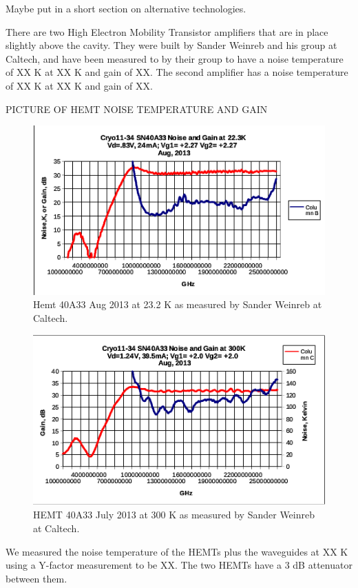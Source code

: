 \documentclass[11pt]{article}
\begin{document}
Maybe put in a short section on alternative technologies.

There are two High Electron Mobility Transistor amplifiers that are in place slightly above the cavity. They were built by Sander Weinreb and his group at Caltech, and have been measured to by their group to have a noise temperature of XX K at XX K and gain of XX. The second amplifier has a noise temperature of XX  K at XX K and gain of XX.

PICTURE OF HEMT NOISE TEMPERATURE AND GAIN
\begin{figure}
\includegraphics[scale=0.9]{hemt1afterrepairaug}
\caption{Hemt 40A33 Aug 2013 at 23.2 K as measured by Sander Weinreb at Caltech.}
\end{figure}

\begin{figure}
\includegraphics[scale=0.9]{hemt1afterrepairwarm}
\caption{HEMT 40A33 July 2013 at 300 K as measured by Sander Weinreb at Caltech.}
\end{figure}

We measured the noise temperature of the HEMTs plus the waveguides at XX K using a Y-factor measurement to be XX. The two HEMTs have a 3 dB attenuator between them.
\end{document}
